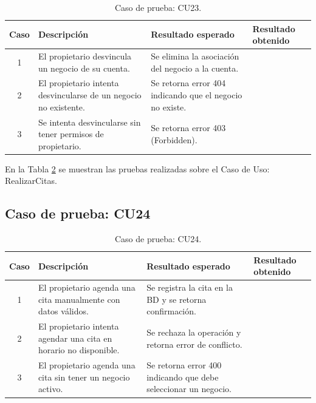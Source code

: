\begin{table}[H]
\centering
\label{tab:cu23_white_test}
\renewcommand{\arraystretch}{1.3}
\begin{tabular}{|c|p{5cm}|p{6cm}|p{2.5cm}|}
\hline
\rowcolor[RGB]{217,217,217}
\textbf{Caso} & \textbf{Descripción} & \textbf{Resultado esperado} & \textbf{Resultado obtenido} \\
\hline

1 &
El propietario desvincula un negocio de su cuenta. &
Se elimina la asociación del negocio a la cuenta. &
 \\
\hline

2 &
El propietario intenta desvincularse de un negocio no existente. &
Se retorna error 404 indicando que el negocio no existe. &
 \\
\hline

3 &
Se intenta desvincularse sin tener permisos de propietario. &
Se retorna error 403 (Forbidden). &
 \\
\hline

\end{tabular}
\caption{Caso de prueba: CU23.}
\label{tab:cu23_white_test}
\end{table}


En la Tabla \ref{tab:cu24_white_test} se muestran las pruebas realizadas sobre el Caso de Uso: RealizarCitas.

\subsection{Caso de prueba: CU24}

\begin{table}[H]
\centering
\label{tab:cu24_white_test}
\renewcommand{\arraystretch}{1.3}
\begin{tabular}{|c|p{5cm}|p{6cm}|p{2.5cm}|}
\hline
\rowcolor[RGB]{217,217,217}
\textbf{Caso} & \textbf{Descripción} & \textbf{Resultado esperado} & \textbf{Resultado obtenido} \\
\hline

1 &
El propietario agenda una cita manualmente con datos válidos. &
Se registra la cita en la BD y se retorna confirmación. &
 \\
\hline

2 &
El propietario intenta agendar una cita en horario no disponible. &
Se rechaza la operación y retorna error de conflicto. &
 \\
\hline

3 &
El propietario agenda una cita sin tener un negocio activo. &
Se retorna error 400 indicando que debe seleccionar un negocio. &
 \\
\hline

\end{tabular}
\caption{Caso de prueba: CU24.}
\label{tab:cu24_white_test}
\end{table}

